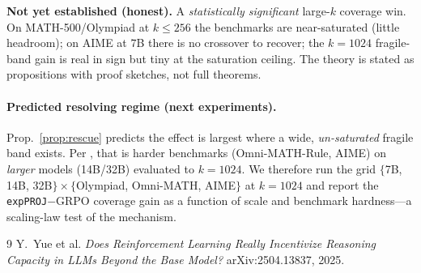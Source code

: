\documentclass[11pt]{article}
\theoremstyle{definition}
\begin{document}
\noindent\textbf{Not yet established (honest).} A \emph{statistically significant} large-$k$ coverage
win. On MATH-500/Olympiad at $k\le256$ the benchmarks are near-saturated (little headroom); on AIME at
$7$B there is no crossover to recover; the $k{=}1024$ fragile-band gain is real in sign but tiny at
the saturation ceiling. The theory is stated as propositions with proof sketches, not full theorems.

\paragraph{Predicted resolving regime (next experiments).} Prop.~\ref{prop:rescue} predicts the
effect is largest where a wide, \emph{un-saturated} fragile band exists. Per \citet{yue2025}, that is
harder benchmarks (Omni-MATH-Rule, AIME) on \emph{larger} models (14B/32B) evaluated to $k{=}1024$.
We therefore run the grid $\{$7B, 14B, 32B$\}\times\{$Olympiad, Omni-MATH, AIME$\}$ at $k{=}1024$ and
report the \texttt{expPROJ}$-$GRPO coverage gain as a function of scale and benchmark hardness---a
scaling-law test of the mechanism.

\begin{thebibliography}{9}
 Y.~Yue et al. \emph{Does Reinforcement Learning Really Incentivize Reasoning
Capacity in LLMs Beyond the Base Model?} arXiv:2504.13837, 2025.
\end{thebibliography}
\end{document}
